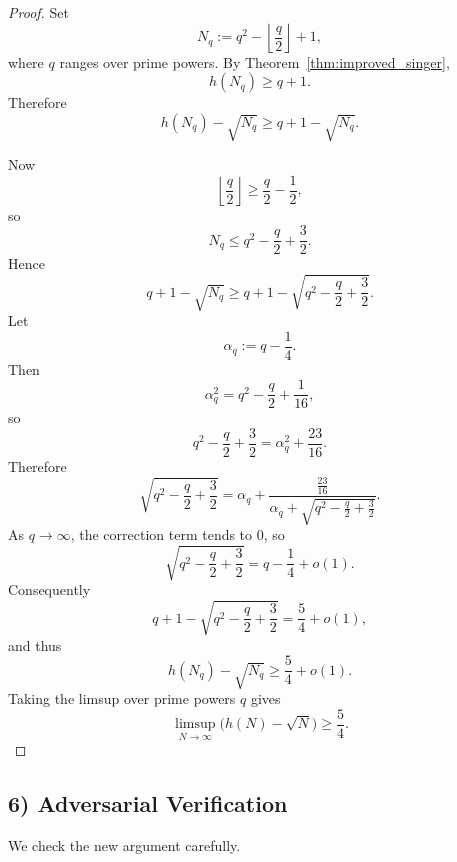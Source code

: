 \begin{proof}
Set
\[
N_q:=q^2-\left\lfloor \frac q2\right\rfloor+1,
\]
where $q$ ranges over prime powers.
By Theorem~\ref{thm:improved_singer},
\[
h(N_q)\ge q+1.
\]
Therefore
\[
h(N_q)-\sqrt{N_q}\ge q+1-\sqrt{N_q}.
\]

Now
\[
\left\lfloor \frac q2\right\rfloor\ge \frac q2-\frac12,
\]
so
\[
N_q\le q^2-\frac q2+\frac32.
\]
Hence
\[
q+1-\sqrt{N_q}\ge q+1-\sqrt{q^2-\frac q2+\frac32}.
\]
Let
\[
\alpha_q:=q-\frac14.
\]
Then
\[
\alpha_q^2=q^2-\frac q2+\frac1{16},
\]
so
\[
q^2-\frac q2+\frac32=\alpha_q^2+\frac{23}{16}.
\]
Therefore
\[
\sqrt{q^2-\frac q2+\frac32}
=\alpha_q+\frac{\frac{23}{16}}{\alpha_q+\sqrt{q^2-\frac q2+\frac32}}.
\]
As $q\to\infty$, the correction term tends to $0$, so
\[
\sqrt{q^2-\frac q2+\frac32}=q-\frac14+o(1).
\]
Consequently
\[
q+1-\sqrt{q^2-\frac q2+\frac32}=\frac54+o(1),
\]
and thus
\[
h(N_q)-\sqrt{N_q}\ge \frac54+o(1).
\]
Taking the limsup over prime powers $q$ gives
\[
\limsup_{N\to\infty}\bigl(h(N)-\sqrt N\bigr)\ge \frac54.
\]
\end{proof}

\subsection{6) Adversarial Verification}
We check the new argument carefully.

